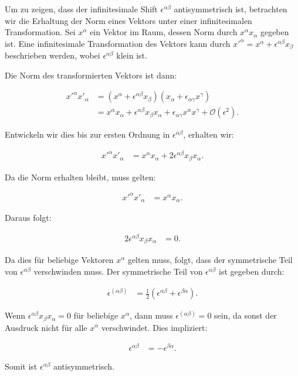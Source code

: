 Um zu zeigen, dass der infinitesimale Shift $\epsilon^{\alpha \beta}$ antisymmetrisch ist, betrachten wir die Erhaltung der Norm eines Vektors unter einer infinitesimalen Transformation. Sei $x^\alpha$ ein Vektor im Raum, dessen Norm durch $x^\alpha x_\alpha$ gegeben ist. Eine infinitesimale Transformation des Vektors kann durch $x'^\alpha = x^\alpha + \epsilon^{\alpha \beta} x_\beta$ beschrieben werden, wobei $\epsilon^{\alpha \beta}$ klein ist.

Die Norm des transformierten Vektors ist dann:

\begin{align*}
x'^\alpha x'_\alpha &= (x^\alpha + \epsilon^{\alpha \beta} x_\beta)(x_\alpha + \epsilon_{\alpha \gamma} x^\gamma) \\
&= x^\alpha x_\alpha + \epsilon^{\alpha \beta} x_\beta x_\alpha + \epsilon_{\alpha \gamma} x^\alpha x^\gamma + \mathcal{O}(\epsilon^2).
\end{align*}

Entwickeln wir dies bis zur ersten Ordnung in $\epsilon^{\alpha \beta}$, erhalten wir:

\begin{align*}
x'^\alpha x'_\alpha &= x^\alpha x_\alpha + 2 \epsilon^{\alpha \beta} x_\beta x_\alpha.
\end{align*}

Da die Norm erhalten bleibt, muss gelten:

\begin{align*}
x'^\alpha x'_\alpha &= x^\alpha x_\alpha.
\end{align*}

Daraus folgt:

\begin{align*}
2 \epsilon^{\alpha \beta} x_\beta x_\alpha &= 0.
\end{align*}

Da dies für beliebige Vektoren $x^\alpha$ gelten muss, folgt, dass der symmetrische Teil von $\epsilon^{\alpha \beta}$ verschwinden muss. Der symmetrische Teil von $\epsilon^{\alpha \beta}$ ist gegeben durch:

\begin{align*}
\epsilon^{(\alpha \beta)} &= \frac{1}{2} (\epsilon^{\alpha \beta} + \epsilon^{\beta \alpha}).
\end{align*}

Wenn $\epsilon^{\alpha \beta} x_\beta x_\alpha = 0$ für beliebige $x^\alpha$, dann muss $\epsilon^{(\alpha \beta)} = 0$ sein, da sonst der Ausdruck nicht für alle $x^\alpha$ verschwindet. Dies impliziert:

\begin{align*}
\epsilon^{\alpha \beta} &= -\epsilon^{\beta \alpha}.
\end{align*}

Somit ist $\epsilon^{\alpha \beta}$ antisymmetrisch.

